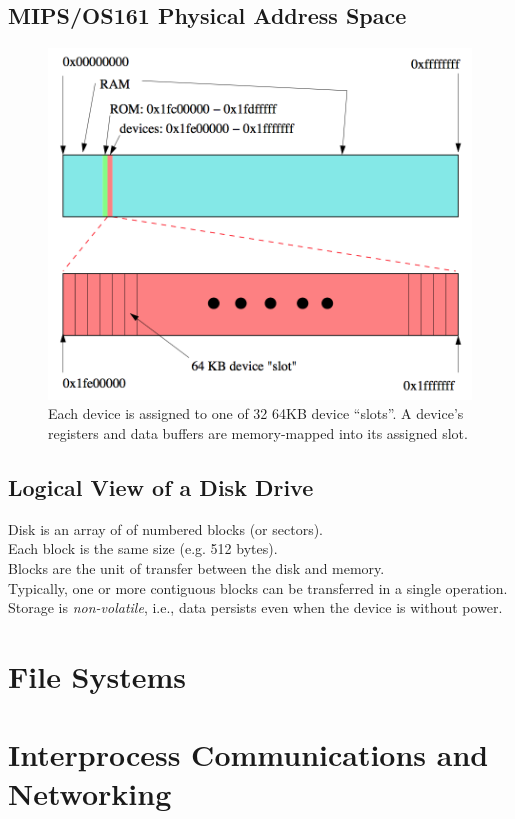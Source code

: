 \documentclass[12pt]{article}
\theoremstyle{plain}
\theoremstyle{definition}
\begin{document}
\subsection{MIPS/OS161 Physical Address Space}
\begin{figure}[H]
  \centering
  \includegraphics[scale=0.55]{pictures/os161_addrspace.png}
  \caption{Each device is assigned to one of 32 64KB device ``slots''. A device's registers and data buffers are memory-mapped into its assigned slot.}
  \label{fig:os161_addrspace}
\end{figure}

\subsection{Logical View of a Disk Drive}
Disk is an array of of numbered blocks (or sectors). \\
Each block is the same size (e.g. 512 bytes). \\

Blocks are the unit of transfer between the disk and memory. \\
Typically, one or more contiguous blocks can be transferred in a single operation. \\

Storage is \emph{non-volatile}, i.e., data persists even when the device is without power.

\newpage
\section{File Systems}

\newpage
\section{Interprocess Communications and Networking}

\clearpage
\printindex
\end{document}
